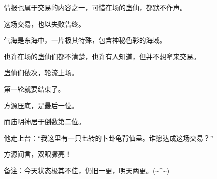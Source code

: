 \begin{this_body}
情报也属于交易的内容之一，可惜在场的蛊仙，都默不作声。

这场交易，也以失败告终。

气海是东海中，一片极其特殊，包含神秘色彩的海域。

也许在场的蛊仙们都不清楚，也许有人知道，但并不想拿来交易。

蛊仙们依次，轮流上场。

第一轮就要结束了。

方源压底，是最后一位。

而庙明神居于倒数第二位。

他走上台：“我这里有一只七转的卜卦龟背仙蛊。谁愿达成这场交易？”

方源闻言，双眼骤亮！

备注：今天状态极其不佳，仍旧一更，明天两更。(\~{}\^{}\~{})

\end{this_body}

